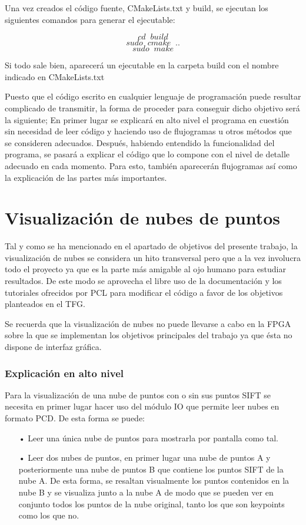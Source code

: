 Una vez creados el código fuente, CMakeLists.txt y build, se ejecutan los siguientes comandos para generar el ejecutable:

$$cd \;\; build$$
$$sudo \;\; cmake \;\; ..$$
$$sudo \;\; make$$

Si todo sale bien, aparecerá un ejecutable en la carpeta build con el nombre indicado en CMakeLists.txt

Puesto que el código escrito en cualquier lenguaje de programación puede resultar complicado de transmitir, la forma de proceder para conseguir dicho objetivo será la siguiente; En primer lugar se explicará en alto nivel el programa en cuestión sin necesidad de leer código y haciendo uso de flujogramas u otros métodos que se consideren adecuados. Después, habiendo entendido la funcionalidad del programa, se pasará a explicar el código que lo compone con el nivel de detalle adecuado en cada momento. Para esto, también aparecerán flujogramas así como la explicación de las partes más importantes.

 
\section{Visualización de nubes de puntos}

Tal y como se ha mencionado en el apartado de objetivos del presente trabajo, la visualización de nubes se considera un hito transversal pero que a la vez involucra todo el proyecto ya que es la parte más amigable al ojo humano para estudiar resultados. De este modo se aprovecha el libre uso de la documentación y los tutoriales ofrecidos por PCL para modificar el código a favor de los objetivos planteados en el TFG.

Se recuerda que la visualización de nubes no puede llevarse a cabo en la FPGA sobre la que se implementan los objetivos principales del trabajo ya que ésta no dispone de interfaz gráfica.

\subsubsection{Explicación en alto nivel}
Para la visualización de una nube de puntos con o sin sus puntos SIFT se necesita en primer lugar hacer uso del módulo IO que permite leer nubes en formato PCD. De esta forma se puede:

\begin{itemize}
\item[•]Leer una única nube de puntos para mostrarla por pantalla como tal.
\item[•]Leer dos nubes de puntos, en primer lugar una nube de puntos A y posteriormente una nube de puntos B que contiene los puntos SIFT de la nube A. De esta forma, se resaltan visualmente los puntos contenidos en la nube B y se visualiza junto a la nube A de modo que se pueden ver en conjunto todos los puntos de la nube original, tanto los que son keypoints como los que no. 
\end{itemize}

